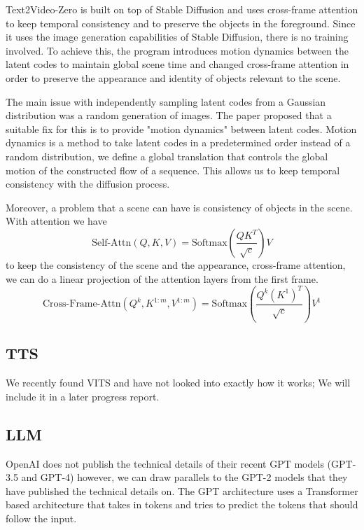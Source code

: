 \documentclass[conference]{IEEEtran}
\begin{document}
Text2Video-Zero is built on top of Stable Diffusion and uses cross-frame attention to keep temporal consistency and to preserve the objects in the foreground. Since it uses the image generation capabilities of Stable Diffusion, there is no training involved. To achieve this, the program introduces motion dynamics between the latent codes to maintain global scene time and changed cross-frame attention in order to preserve the appearance and identity of objects relevant to the scene.

The main issue with independently sampling latent codes from a Gaussian distribution was a random generation of images. The paper proposed that a suitable fix for this is to provide "motion dynamics" between latent codes. Motion dynamics is a method to take latent codes in a predetermined order instead of a random distribution, we define a global translation that controls the global motion of the constructed flow of a sequence. This allows us to keep temporal consistency with the diffusion process. 

Moreover, a problem that a scene can have is consistency of objects in the scene. With attention we have 
\begin{equation}
    \text{Self-Attn}(Q, K, V) = \text{Softmax}(\frac{QK^T}{\sqrt{c}})V
\end{equation}
to keep the consistency of the scene and the appearance, cross-frame attention, we can do a linear projection of the attention layers from the first frame.
\begin{equation}
    \text{Cross-Frame-Attn}(Q^k, K^{1:m}, V^{1:m}) = \text{Softmax}(\frac{Q^k(K^1)^T}{\sqrt{c}})V^1
\end{equation}

\subsection{TTS}
We recently found VITS \cite{vits} and have not looked into exactly how it works; We will include it in a later progress report.

\subsection{LLM}
OpenAI does not publish the technical details of their recent GPT models (GPT-3.5 and GPT-4) however, we can draw
parallels to the GPT-2 \cite{gpt2} models that they have published the technical details on.
The GPT \cite{gpt} architecture uses a Transformer based architecture that takes in tokens and tries to
predict the tokens that should follow the input.
\end{document}
